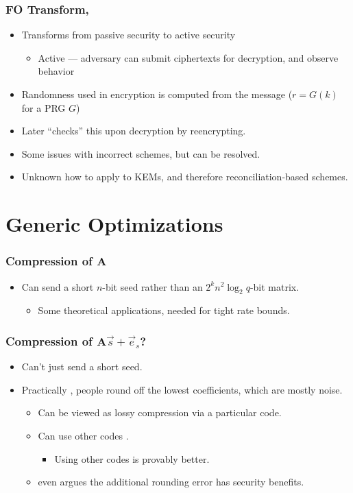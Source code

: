 \documentclass{beamer}
\newcommand{\mat}[1]{\mathbf{#1}}
\theoremstyle{definition}
\begin{document}
\begin{frame}
	\frametitle{FO Transform, \cite{C:FujOka99,TCC:HofHovKil17}}
	\begin{itemize}
		\item Transforms from \alert{passive} security to \alert{active} security\pause
		\begin{itemize}
			\item Active --- adversary can submit ciphertexts for decryption, and observe behavior\pause
		\end{itemize}
	\item \alert{Randomness} used in encryption is \alert{computed from the message} ($r = G(k)$ for a PRG $G$)\pause
	\item Later ``checks'' this upon decryption by \alert{reencrypting}.\pause
\item Some issues with \alert{incorrect} schemes, but can be resolved.\pause
\item Unknown how to apply to \alert{KEM}s, and therefore reconciliation-based schemes.
	\end{itemize}
\end{frame}


\section{Generic Optimizations}

\begin{frame}
	\frametitle{Compression of $\mathbf{A}$}
	\begin{itemize}
		\item Can send a short $n$-bit seed rather than an $2^kn^2\log_2 q$-bit matrix.\pause
		\begin{itemize}
			\item Some theoretical applications, needed for \alert{tight rate bounds}.
		\end{itemize}
	\end{itemize}
\end{frame}
\begin{frame}
	\frametitle{Compression of $\mat A\vec s + \vec e_s$?}
	\begin{itemize}
		\item Can't just send a short seed.\pause 
		\item Practically \cite{KYBER-spec,AFRICACRYPT:DKRV18}, people \alert{round off} the lowest coefficients, which are mostly noise.\pause
		\begin{itemize}
			\item Can be viewed as \alert{lossy compression} via a particular code.\pause
			\item Can use other codes \cite{TCC:BDGM19}.\pause
			\begin{itemize}
				\item Using other codes is \alert{provably better}.\pause
			\end{itemize}
			\item \cite{KYBER-spec} even argues the additional rounding error has \alert{security benefits}.
		\end{itemize}
	\end{itemize}
\end{frame}
\end{document}
